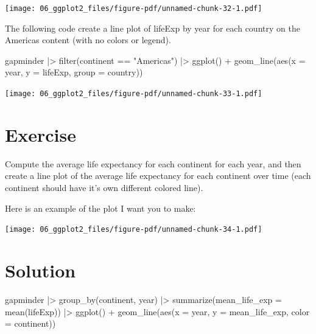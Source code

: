 \documentclass[
  letterpaper,
  DIV=11,
  numbers=noendperiod]{scrreprt}
\newenvironment{Shaded}{\begin{snugshade}}{\end{snugshade}}
\newcommand{\AttributeTok}[1]{\textcolor[rgb]{0.40,0.45,0.13}{#1}}
\newcommand{\FunctionTok}[1]{\textcolor[rgb]{0.28,0.35,0.67}{#1}}
\newcommand{\NormalTok}[1]{\textcolor[rgb]{0.00,0.23,0.31}{#1}}
\newcommand{\SpecialCharTok}[1]{\textcolor[rgb]{0.37,0.37,0.37}{#1}}
\newcommand{\StringTok}[1]{\textcolor[rgb]{0.13,0.47,0.30}{#1}}
\begin{document}
\texttt{[image: 06\_ggplot2\_files/figure-pdf/unnamed-chunk-32-1.pdf]}

The following code create a line plot of lifeExp by year for each
country on the Americas content (with no colors or legend).

\begin{Shaded}
\begin{Highlighting}[]
\NormalTok{gapminder }\SpecialCharTok{|\textgreater{}} 
  \FunctionTok{filter}\NormalTok{(continent }\SpecialCharTok{==} \StringTok{"Americas"}\NormalTok{) }\SpecialCharTok{|\textgreater{}} 
  \FunctionTok{ggplot}\NormalTok{() }\SpecialCharTok{+} 
  \FunctionTok{geom\_line}\NormalTok{(}\FunctionTok{aes}\NormalTok{(}\AttributeTok{x =}\NormalTok{ year, }
                \AttributeTok{y =}\NormalTok{ lifeExp, }
                \AttributeTok{group =}\NormalTok{ country))}
\end{Highlighting}
\end{Shaded}

\texttt{[image: 06\_ggplot2\_files/figure-pdf/unnamed-chunk-33-1.pdf]}

\section{Exercise}

Compute the average life expectancy for each continent for each year,
and then create a line plot of the average life expectancy for each
continent over time (each continent should have it's own different
colored line).

Here is an example of the plot I want you to make:

\texttt{[image: 06\_ggplot2\_files/figure-pdf/unnamed-chunk-34-1.pdf]}

\section{Solution}

\begin{Shaded}
\begin{Highlighting}[]
\NormalTok{gapminder }\SpecialCharTok{|\textgreater{}} 
  \FunctionTok{group\_by}\NormalTok{(continent, year) }\SpecialCharTok{|\textgreater{}} 
  \FunctionTok{summarize}\NormalTok{(}\AttributeTok{mean\_life\_exp =} \FunctionTok{mean}\NormalTok{(lifeExp)) }\SpecialCharTok{|\textgreater{}} 
  \FunctionTok{ggplot}\NormalTok{() }\SpecialCharTok{+}
  \FunctionTok{geom\_line}\NormalTok{(}\FunctionTok{aes}\NormalTok{(}\AttributeTok{x =}\NormalTok{ year, }
                \AttributeTok{y =}\NormalTok{ mean\_life\_exp, }
                \AttributeTok{color =}\NormalTok{ continent))}
\end{Highlighting}
\end{Shaded}
\end{document}
